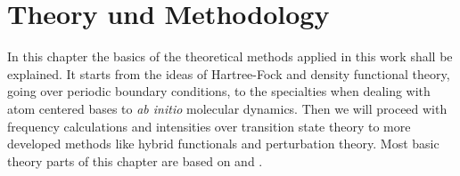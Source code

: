 \documentclass[11pt,DIV=13,BCOR=5mm,a4paper,headinclude]{scrbook}
\begin{document}

\renewcommand{\contentsname}{Contents}
\clearpage
\tableofcontents
\clearpage

\chapter{Theory und Methodology}
In this chapter the basics of the theoretical methods applied in this work shall be explained.
It starts from the ideas of Hartree-Fock and density functional theory, going over periodic boundary conditions, to the specialties when dealing with atom centered bases to \textit{ab initio} molecular dynamics.
Then we will proceed with frequency calculations and intensities over transition state theory to more developed methods like hybrid functionals and perturbation theory.
Most basic theory parts of this chapter are based on \cite{jensen} and \cite{Gross03}.
\end{document}
